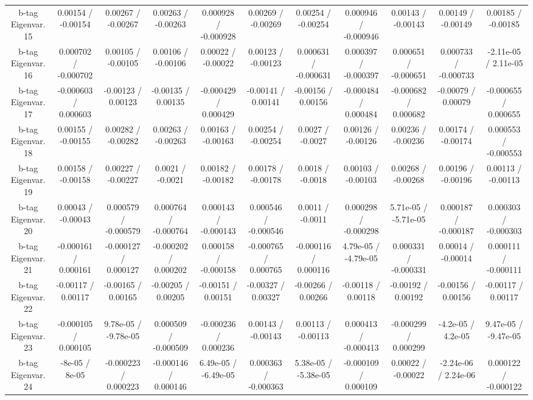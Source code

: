 \begin{table}[htbp]
\begin{center}
\begin{tabular}{|c|c|c|c|c|c|c|c|c|c|c|}
  b-tag Eigenvar. 15 & 0.00154 / -0.00154 & 0.00267 / -0.00267 & 0.00263 / -0.00263 & 0.000928 / -0.000928 & 0.00269 / -0.00269 & 0.00254 / -0.00254 & 0.000946 / -0.000946 & 0.00143 / -0.00143 & 0.00149 / -0.00149 & 0.00185 / -0.00185 \\ 
  b-tag Eigenvar. 16 & 0.000702 / -0.000702 & 0.00105 / -0.00105 & 0.00106 / -0.00106 & 0.00022 / -0.00022 & 0.00123 / -0.00123 & 0.000631 / -0.000631 & 0.000397 / -0.000397 & 0.000651 / -0.000651 & 0.000733 / -0.000733 & -2.11e-05 / 2.11e-05 \\ 
  b-tag Eigenvar. 17 & -0.000603 / 0.000603 & -0.00123 / 0.00123 & -0.00135 / 0.00135 & -0.000429 / 0.000429 & -0.00141 / 0.00141 & -0.00156 / 0.00156 & -0.000484 / 0.000484 & -0.000682 / 0.000682 & -0.00079 / 0.00079 & -0.000655 / 0.000655 \\ 
  b-tag Eigenvar. 18 & 0.00155 / -0.00155 & 0.00282 / -0.00282 & 0.00263 / -0.00263 & 0.00163 / -0.00163 & 0.00254 / -0.00254 & 0.0027 / -0.0027 & 0.00126 / -0.00126 & 0.00236 / -0.00236 & 0.00174 / -0.00174 & 0.000553 / -0.000553 \\ 
  b-tag Eigenvar. 19 & 0.00158 / -0.00158 & 0.00227 / -0.00227 & 0.0021 / -0.0021 & 0.00182 / -0.00182 & 0.00178 / -0.00178 & 0.0018 / -0.0018 & 0.00103 / -0.00103 & 0.00268 / -0.00268 & 0.00196 / -0.00196 & 0.00113 / -0.00113 \\ 
  b-tag Eigenvar. 20 & 0.00043 / -0.00043 & 0.000579 / -0.000579 & 0.000764 / -0.000764 & 0.000143 / -0.000143 & 0.000546 / -0.000546 & 0.0011 / -0.0011 & 0.000298 / -0.000298 & 5.71e-05 / -5.71e-05 & 0.000187 / -0.000187 & 0.000303 / -0.000303 \\ 
  b-tag Eigenvar. 21 & -0.000161 / 0.000161 & -0.000127 / 0.000127 & -0.000202 / 0.000202 & 0.000158 / -0.000158 & -0.000765 / 0.000765 & -0.000116 / 0.000116 & 4.79e-05 / -4.79e-05 & 0.000331 / -0.000331 & 0.00014 / -0.00014 & 0.000111 / -0.000111 \\ 
  b-tag Eigenvar. 22 & -0.00117 / 0.00117 & -0.00165 / 0.00165 & -0.00205 / 0.00205 & -0.00151 / 0.00151 & -0.00327 / 0.00327 & -0.00266 / 0.00266 & -0.00118 / 0.00118 & -0.00192 / 0.00192 & -0.00156 / 0.00156 & -0.00117 / 0.00117 \\ 
  b-tag Eigenvar. 23 & -0.000105 / 0.000105 & 9.78e-05 / -9.78e-05 & 0.000509 / -0.000509 & -0.000236 / 0.000236 & 0.00143 / -0.00143 & 0.00113 / -0.00113 & 0.000413 / -0.000413 & -0.000299 / 0.000299 & -4.2e-05 / 4.2e-05 & 9.47e-05 / -9.47e-05 \\ 
  b-tag Eigenvar. 24 & -8e-05 / 8e-05 & -0.000223 / 0.000223 & -0.000146 / 0.000146 & 6.49e-05 / -6.49e-05 & 0.000363 / -0.000363 & 5.38e-05 / -5.38e-05 & -0.000109 / 0.000109 & 0.00022 / -0.00022 & -2.24e-06 / 2.24e-06 & 0.000122 / -0.000122 \\ 

\end{tabular}
\end{center}
\end{table}
